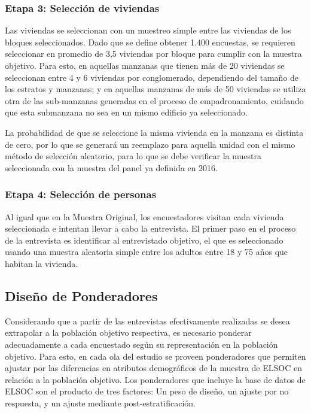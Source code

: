 \documentclass[
  12pt,
]{article}
\begin{document}
\hypertarget{etapa3refresco}{%
\subsubsection*{Etapa 3: Selección de viviendas}\label{etapa3refresco}}

Las viviendas se seleccionan con un muestreo simple entre las viviendas de los bloques seleccionados. Dado que se define obtener 1.400 encuestas, se requieren seleccionar en promedio de 3,5 viviendas por bloque para cumplir con la muestra objetivo. Para esto, en aquellas manzanas que tienen más de 20 viviendas se seleccionan entre 4 y 6 viviendas por conglomerado, dependiendo del tamaño de los estratos y manzanas; y en aquellas manzanas de más de 50 viviendas se utiliza otra de las sub-manzanas generadas en el proceso de empadronamiento, cuidando que esta submanzana no sea en un mismo edificio ya seleccionado.

La probabilidad de que se seleccione la misma vivienda en la manzana es distinta de cero, por lo que se generará un reemplazo para aquella unidad con el mismo método de selección aleatorio, para lo que se debe verificar la muestra seleccionada con la muestra del panel ya definida en 2016.

\hypertarget{etapa4refresco}{%
\subsubsection*{Etapa 4: Selección de personas}\label{etapa4refresco}}

Al igual que en la Muestra Original, los encuestadores visitan cada vivienda seleccionada e intentan llevar a cabo la entrevista. El primer paso en el proceso de la entrevista es identificar al entrevistado objetivo, el que es seleccionado usando una muestra aleatoria simple entre los adultos entre 18 y 75 años que habitan la vivienda.

\hypertarget{dis_ponderadores}{%
\subsection{Diseño de Ponderadores}\label{dis_ponderadores}}

Considerando que a partir de las entrevistas efectivamente realizadas se desea extrapolar a la población objetivo respectiva, es necesario ponderar adecuadamente a cada encuestado según su representación en la población objetivo. Para esto, en cada ola del estudio se proveen ponderadores que permiten ajustar por las diferencias en atributos demográficos de la muestra de ELSOC en relación a la población objetivo. Los ponderadores que incluye la base de datos de ELSOC son el producto de tres factores: Un peso de diseño, un ajuste por no respuesta, y un ajuste mediante post-estratificación.
\end{document}
